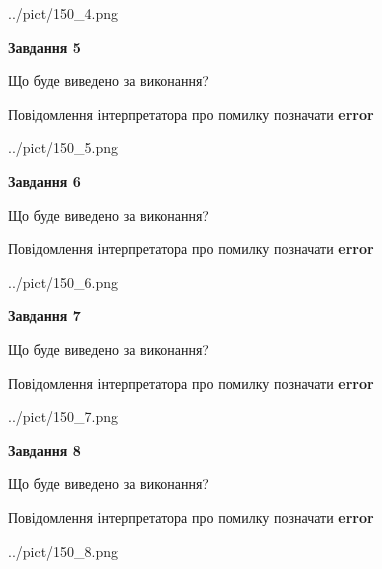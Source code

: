\documentclass[12pt, ukrainian]{article}
\begin{document}
{\begin{center}
	{../pict/150_4.png}
\end{center}
\newpage

{\begin {center}\textbf{Завдання 5}\end {center}}\par
Що буде виведено за виконання? \par
Повідомлення інтерпретатора про помилку позначати \textbf{error}

\begin{center}
	{../pict/150_5.png}
\end{center}
\newpage

{\begin {center}\textbf{Завдання 6}\end {center}}\par
Що буде виведено за виконання? \par
Повідомлення інтерпретатора про помилку позначати \textbf{error}

\begin{center}
	{../pict/150_6.png}
\end{center}
\newpage

{\begin {center}\textbf{Завдання 7}\end {center}}\par
Що буде виведено за виконання? \par
Повідомлення інтерпретатора про помилку позначати \textbf{error}

\begin{center}
	{../pict/150_7.png}
\end{center}
\newpage

{\begin {center}\textbf{Завдання 8}\end {center}}\par
Що буде виведено за виконання? \par
Повідомлення інтерпретатора про помилку позначати \textbf{error}

\begin{center}
	{../pict/150_8.png}
\end{center}
\newpage

}
\end{document}
